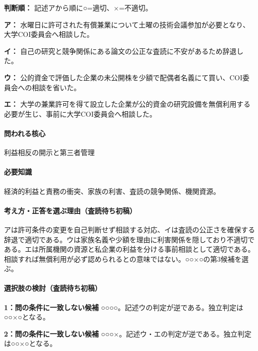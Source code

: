 \noindent\textbf{判断順：} 記述アから順に○=適切、×=不適切。\par

\noindent\textbf{ア：} 水曜日に許可された有償兼業について土曜の技術会議参加が必要となり、大学COI委員会へ相談した。\par

\noindent\textbf{イ：} 自己の研究と競争関係にある論文の公正な査読に不安があるため辞退した。\par

\noindent\textbf{ウ：} 公的資金で評価した企業の未公開株を少額で配偶者名義にて買い、COI委員会への相談を省いた。\par

\noindent\textbf{エ：} 大学の兼業許可を得て設立した企業が公的資金の研究設備を無償利用する必要が生じ、事前に大学COI委員会へ相談した。\par

\paragraph{問われる核心} 利益相反の開示と第三者管理

\paragraph{必要知識} 経済的利益と責務の衝突、家族の利害、査読の競争関係、機関資源。

\paragraph{考え方・正答を選ぶ理由（査読待ち初稿）} アは許可条件の変更を自己判断せず相談する対応、イは査読の公正さを確保する辞退で適切である。ウは家族名義や少額を理由に利害関係を隠しており不適切である。エは所属機関の資源と私企業の利益を分ける事前相談として適切である。相談すれば無償利用が必ず認められるとの意味ではない。○○×○の第3候補を選ぶ。

\paragraph{選択肢の検討（査読待ち初稿）}\mbox{}\par

\noindent\textbf{1：問の条件に一致しない候補} ○○○○。記述ウの判定が逆である。独立判定は○○×○となる。\par

\noindent\textbf{2：問の条件に一致しない候補} ○○○×。記述ウ・エの判定が逆である。独立判定は○○×○となる。\par

